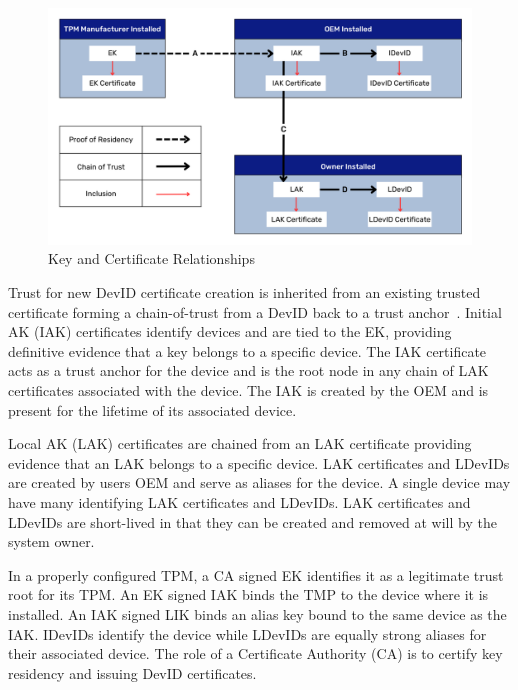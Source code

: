 \documentclass[runningheads]{llncs}
\begin{document}
\begin{figure}[htbp]
  \begin{centering}
  \includegraphics[width=\linewidth]{figures/certRelationships.png}
  \par\end{centering}
  \caption{Key and Certificate Relationships \citep{DevIDSpec-TCG}}
  \label{fig:cert_rel}
\end{figure}

Trust for new DevID certificate creation is inherited from an existing
trusted certificate forming a chain-of-trust from a DevID back to a
trust anchor~\citep{DevIDSpec-TCG}. Initial AK (IAK) certificates
identify devices and are tied to the EK, providing definitive evidence
that a key belongs to a specific device. The IAK certificate acts as a
trust anchor for the device and is the root node in any chain of LAK
certificates associated with the device.  The IAK is created by the
OEM and is present for the lifetime of its associated device.%

Local AK (LAK) certificates are chained from an LAK certificate
providing evidence that an LAK belongs to a specific device.  LAK
certificates and LDevIDs are created by users OEM and serve as aliases
for the device.  A single device may have many identifying LAK
certificates and LDevIDs.  LAK certificates and LDevIDs are
short-lived in that they can be created and removed at will by the
system owner.

In a properly configured TPM, a CA signed EK identifies it as a
legitimate trust root for its TPM.  An EK signed IAK binds the TMP to
the device where it is installed.  An IAK signed LIK binds an alias
key bound to the same device as the IAK.  IDevIDs identify the device
while LDevIDs are equally strong aliases for their associated device.
The role of a Certificate Authority (CA) is to certify key residency
and issuing DevID certificates.
\end{document}
